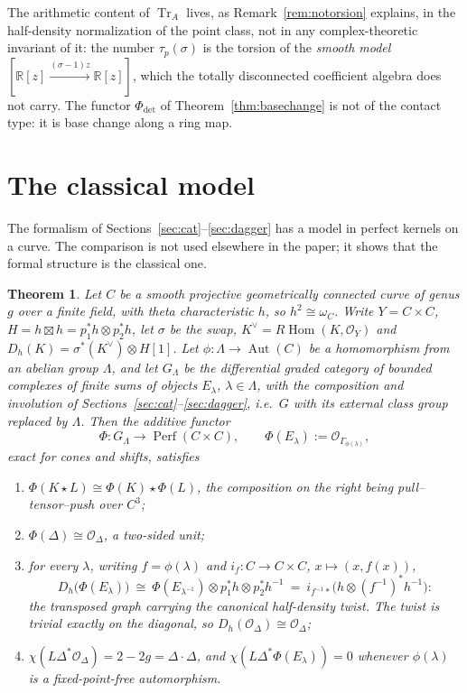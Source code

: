 \documentclass[11pt]{amsart}
\newtheorem{theorem}{Theorem}[section]
\theoremstyle{definition}
\theoremstyle{remark}
\newcommand{\R}{\mathbb R}
\newcommand{\Tr}{\operatorname{Tr}}
\newcommand{\Hom}{\operatorname{Hom}}
\newcommand{\Perf}{\operatorname{Perf}}
\newcommand{\Aut}{\operatorname{Aut}}
\begin{document}
The arithmetic content of $\Tr_A$ lives, as Remark~\ref{rem:notorsion} explains,
in the half-density normalization of the point class, not in any
complex-theoretic invariant of it: the number $\tau_p(\sigma)$ is the torsion of
the \emph{smooth model} $[\R[z]\xrightarrow{(\sigma-1)z}\R[z]]$, which the
totally disconnected coefficient algebra does not carry.  The functor
$\Phi_{\det}$ of Theorem~\ref{thm:basechange} is not of the contact type: it is
base change along a ring map.

\section{The classical model}\label{sec:classical}

The formalism of Sections~\ref{sec:cat}--\ref{sec:dagger} has a model in
perfect kernels on a curve.  The comparison is not used elsewhere in the
paper; it shows that the formal structure is the classical one.

\begin{theorem}\label{thm:classical}
Let $C$ be a smooth projective geometrically connected curve of genus $g$ over
a finite field, with theta characteristic $h$, so $h^{2}\cong\omega_C$.  Write
$Y=C\times C$, $H=h\boxtimes h=p_1^{*}h\otimes p_2^{*}h$, let $\sigma$ be the
swap, $K^{\vee}=R\!\Hom(K,\mathcal O_Y)$ and
$D_h(K)=\sigma^{*}(K^{\vee})\otimes H[1]$.  Let $\phi:\Lambda\to\Aut(C)$ be a
homomorphism from an abelian group $\Lambda$, and let $G_{\Lambda}$ be the
differential graded category of bounded complexes of finite sums of objects
$E_{\lambda}$, $\lambda\in\Lambda$, with the composition and involution of
Sections~\ref{sec:cat}--\ref{sec:dagger}, i.e.\ $G$ with its external class
group replaced by $\Lambda$.  Then the additive functor
\[
\Phi:G_{\Lambda}\longrightarrow\Perf(C\times C),\qquad
\Phi(E_{\lambda}):=\mathcal O_{\Gamma_{\phi(\lambda)}},
\]
exact for cones and shifts, satisfies
\begin{enumerate}
\item[(a)] $\Phi(K\star L)\cong\Phi(K)\star\Phi(L)$, the composition on the
right being pull--tensor--push over $C^{3}$;
\item[(b)] $\Phi(\Delta)\cong\mathcal O_{\Delta}$, a two-sided unit;
\item[(c)] for every $\lambda$, writing $f=\phi(\lambda)$ and
$i_{f}:C\to C\times C$, $x\mapsto(x,f(x))$,
\begin{equation}\label{eq:dualitygraph}
D_h\bigl(\Phi(E_{\lambda})\bigr)\ \cong\
\Phi(E_{\lambda^{-1}})\otimes p_1^{*}h\otimes p_2^{*}h^{-1}
\ =\ i_{f^{-1}*}\bigl(h\otimes(f^{-1})^{*}h^{-1}\bigr):
\end{equation}
the transposed graph carrying the canonical half-density twist.  The twist is
trivial exactly on the diagonal, so $D_h(\mathcal O_{\Delta})\cong
\mathcal O_{\Delta}$;
\item[(d)] $\chi(L\Delta^{*}\mathcal O_{\Delta})=2-2g=\Delta\cdot\Delta$, and
$\chi(L\Delta^{*}\Phi(E_{\lambda}))=0$ whenever $\phi(\lambda)$ is a
fixed-point-free automorphism.
\end{enumerate}
\end{theorem}
\end{document}

